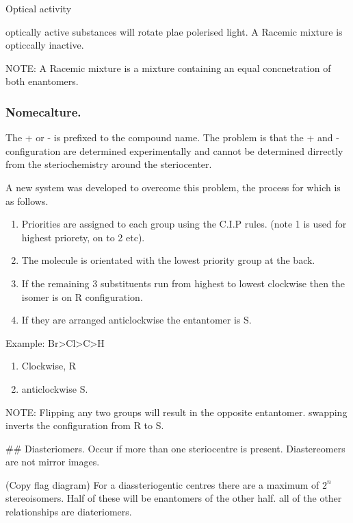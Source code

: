\documentclass[]{article}
\providecommand{\tightlist}{%
  \setlength{\itemsep}{0pt}\setlength{\parskip}{0pt}}
\begin{document}
Optical activity

optically active substances will rotate plae polerised light. A Racemic
mixture is opticcally inactive.

NOTE: A Racemic mixture is a mixture containing an equal concnetration
of both enantomers.

\subsubsection{Nomecalture.}\label{nomecalture.}

The + or - is prefixed to the compound name. The problem is that the +
and - configuration are determined experimentally and cannot be
determined dirrectly from the steriochemistry around the steriocenter.

A new system was developed to overcome this problem, the process for
which is as follows.

\begin{enumerate}
\tightlist
\item
  Priorities are assigned to each group using the C.I.P rules. (note 1
  is used for highest priorety, on to 2 etc).
\item
  The molecule is orientated with the lowest priority group at the back.
\item
  If the remaining 3 substituents run from highest to lowest clockwise
  then the isomer is on R configuration.
\item
  If they are arranged anticlockwise the entantomer is S.
\end{enumerate}

Example: Br\textgreater{}Cl\textgreater{}C\textgreater{}H

\begin{enumerate}
\tightlist
\item
  Clockwise, R
\item
  anticlockwise S.
\end{enumerate}

NOTE: Flipping any two groups will result in the opposite entantomer.
swapping inverts the configuration from R to S.

\#\# Diasteriomers. Occur if more than one steriocentre is present.
Diastereomers are not mirror images.

(Copy flag diagram) For a diassteriogentic centres there are a maximum
of \(2^n\) stereoisomers. Half of these will be enantomers of the other
half. all of the other relationships are diateriomers.
\end{document}
